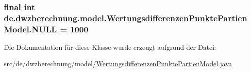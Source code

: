 \subsubsection[{\texorpdfstring{N\+U\+LL}{NULL}}]{\setlength{\rightskip}{0pt plus 5cm}final int de.\+dwzberechnung.\+model.\+Wertungsdifferenzen\+Punkte\+Partien\+Model.\+N\+U\+LL = 1000\hspace{0.3cm}{\ttfamily [static]}}\hypertarget{classde_1_1dwzberechnung_1_1model_1_1_wertungsdifferenzen_punkte_partien_model_add5237c444126bf1e5c7a76b59a2a008}{}\label{classde_1_1dwzberechnung_1_1model_1_1_wertungsdifferenzen_punkte_partien_model_add5237c444126bf1e5c7a76b59a2a008}


Die Dokumentation für diese Klasse wurde erzeugt aufgrund der Datei\+:\begin{DoxyCompactItemize}
\item 
src/de/dwzberechnung/model/\hyperlink{_wertungsdifferenzen_punkte_partien_model_8java}{Wertungsdifferenzen\+Punkte\+Partien\+Model.\+java}\end{DoxyCompactItemize}
